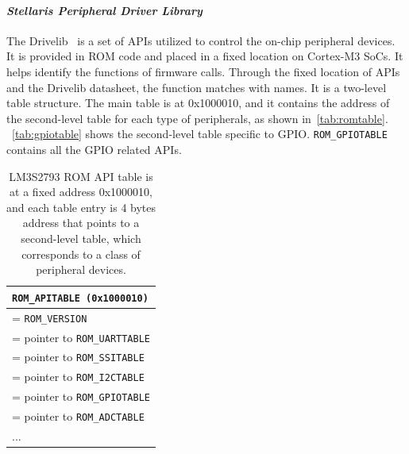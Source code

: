 \paragraph{\textbf{\textit{Stellaris Peripheral Driver Library}}} The Drivelib~\cite{lm3s2793rom} is a set of APIs utilized to control the on-chip peripheral devices. It is provided in ROM code and placed in a fixed location on Cortex-M3 SoCs. It helps identify the functions of firmware calls. Through the fixed location of APIs and the Drivelib datasheet, the function matches with names. It is a two-level table structure. The main table is at 0x1000010, and it contains the address of the second-level table for each type of peripherals, as shown in~\autoref{tab:romtable}. ~\autoref{tab:gpiotable} shows the second-level table specific to GPIO.  \texttt{ROM\_GPIOTABLE} contains all the GPIO related APIs. %
%
\begin{center}
	\begin{table}
		\small
		\begin{tabular}{|p{7.2cm}|} 
			\hline
			\texttt{ROM\_APITABLE (0x1000010)} \\ %
			\hline
			[0] = \texttt{ROM\_VERSION} \\
			\hline
			[1] = pointer to \texttt{ROM\_UARTTABLE} \\
			\hline
			[2] = pointer to \texttt{ROM\_SSITABLE} \\
			\hline
			[3] = pointer to \texttt{ROM\_I2CTABLE} \\
			\hline
			[4] = pointer to \texttt{ROM\_GPIOTABLE} \\
			\hline
			[5] = pointer to \texttt{ROM\_ADCTABLE} \\
			\hline
			... \\ 
			\hline
		\end{tabular}
		\caption{LM3S2793 ROM API table is at a fixed address 0x1000010, and each table entry is 4 bytes address that points to a second-level table, which corresponds to a class of peripheral devices.}
		\label{tab:romtable}
	\end{table}
\end{center}
%
